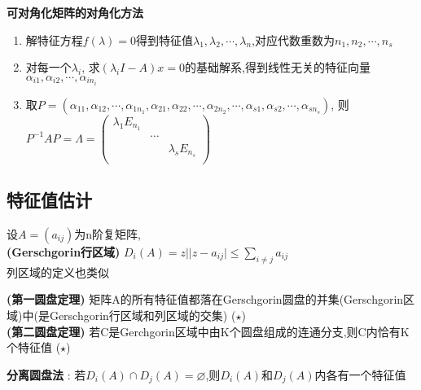 \begin{Chinese Note}
    \textbf{可对角化矩阵的对角化方法}
    \begin{enumerate}
        \item 解特征方程$f(\lambda)=0$得到特征值$\lambda_1,\lambda_2,\cdots,\lambda_n$,对应代数重数为$n_1,n_2,\cdots,n_s$
        \item 对每一个$\lambda_i$, 求$(\lambda_i I-A)x=0$的基础解系,得到线性无关的特征向量$\alpha_{i1},\alpha_{i2},\cdots,\alpha_{in_i}$ 
        \item 取$P=(\alpha_{11},\alpha_{12},\cdots,\alpha_{1n_1},\alpha_{21},\alpha_{22},\cdots,\alpha_{2n_2},\cdots,\alpha_{s1},\alpha_{s2},\cdots,\alpha_{sn_s})$,
        则$P^{-1}AP=\Lambda=
        \left(\begin{array}{ccc}   
                    \lambda_1E_{n_1} &  &\\
                     & \cdots& \\
                     &  &  \lambda_sE_{n_s}\\
                \end{array}\right)$                 
    \end{enumerate}
\end{Chinese Note}

\subsection{特征值估计}
\begin{tcolorbox}
    [colback=Emerald!10,colframe=cyan!40!black,title=\textbf{Gerschgorin圆盘}]
    设$A=(a_{ij})$为n阶复矩阵,\\
    \textbf{(Gerschgorin行区域)} $D_{i}(A) = {z||z-a_{ij}|\leq \sum_{i\neq j}a_{ij}}$\\
    列区域的定义也类似
\end{tcolorbox}

\begin{tcolorbox}[title=\textbf{圆盘定理},colback=SeaGreen!10!CornflowerBlue!10,colframe=RoyalPurple!55!Aquamarine!100!]
    \textbf{(第一圆盘定理)} 矩阵A的所有特征值都落在Gerschgorin圆盘的并集(Gerschgorin区域)中(是Gerschgorin行区域和列区域的交集)
    ($\star$)\\
    \textbf{(第二圆盘定理)} 若C是Gerchgorin区域中由K个圆盘组成的连通分支,则C内恰有K个特征值
    ($\star$)
\end{tcolorbox}
\textbf{分离圆盘法} : 若$D_i(A)\cap D_j(A)=\varnothing$,则$D_i(A)$和$D_j(A)$内各有一个特征值

